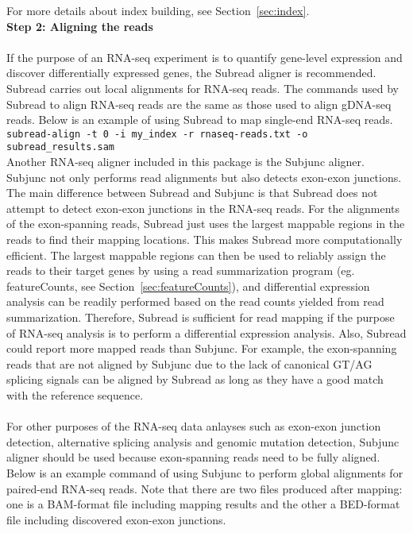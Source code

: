 \documentclass[12pt]{report}
\newcommand{\code}[1]{{\small\texttt{#1}}}
\newcommand{\Subread}{\textsf{Subread}}
\newcommand{\Subjunc}{\textsf{Subjunc}}
\newcommand{\featureCounts}{\textsf{featureCounts}}
\begin{document}
\noindent For more details about index building, see Section~\ref{sec:index}.\\

{\noindent\bf Step 2: Aligning the reads}\\

\noindent{{\Subread}}\\

\noindent If the purpose of an RNA-seq experiment is to quantify gene-level expression and discover differentially expressed genes, the {\Subread} aligner is recommended.
{\Subread} carries out local alignments for RNA-seq reads.
The commands used by {\Subread} to align RNA-seq reads are the same as those used to align gDNA-seq reads.
Below is an example of using {\Subread} to map single-end RNA-seq reads.\\

\code{subread-align -t 0 -i my\_index -r rnaseq-reads.txt -o subread\_results.sam}\\

\noindent Another RNA-seq aligner included in this package is the {\Subjunc} aligner.
{\Subjunc} not only performs read alignments but also detects exon-exon junctions.
The main difference between {\Subread} and {\Subjunc} is that {\Subread} does not attempt to detect exon-exon junctions in the RNA-seq reads.
For the alignments of the exon-spanning reads, {\Subread} just uses the largest mappable regions in the reads to find their mapping locations.
This makes {\Subread} more computationally efficient.
The largest mappable regions can then be used to reliably assign the reads to their target genes by using a read summarization program (eg. \featureCounts, see Section~\ref{sec:featureCounts}), and differential expression analysis can be readily performed based on the read counts yielded from read summarization.
Therefore, {\Subread} is sufficient for read mapping if the purpose of RNA-seq analysis is to perform a differential expression analysis. 
Also, {\Subread} could report more mapped reads than {\Subjunc}.
For example, the exon-spanning reads that are not aligned by {\Subjunc} due to the lack of canonical GT/AG splicing signals can be aligned by {\Subread} as long as they have a good match with the reference sequence.\\

\noindent{{\Subjunc}}\\

For other purposes of the RNA-seq data anlayses such as exon-exon junction detection, alternative splicing analysis and genomic mutation detection, {\Subjunc} aligner should be used because exon-spanning reads need to be fully aligned.
Below is an example command of using {\Subjunc} to perform global alignments for paired-end RNA-seq reads.
Note that there are two files produced after mapping: one is a BAM-format file including mapping results and the other a BED-format file including discovered exon-exon junctions.\\
\end{document}
